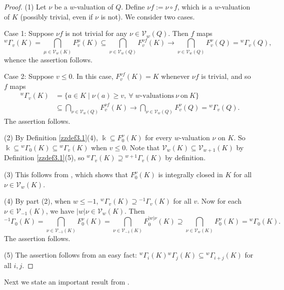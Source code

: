 \documentclass[12pt]{amsart}
\theoremstyle{plain}
\numberwithin{theorem}{section}
\numberwithin{equation}{theorem}
\theoremstyle{definition}
\newcommand \calV {{\mathcal{V}}}
\begin{document}
\begin{proof}
(1) 
Let $\nu$ be a $w$-valuation of $Q$. Define 
$\nu f := \nu \circ f$, which is a
$w$-valuation of $K$ (possibly trivial, even if $\nu$ is not). 
We consider two cases.

Case 1: Suppose $\nu f$ is not trivial for any
$\nu\in {\mathcal V}_w(Q)$.
Then $f$ maps 
$${^{w}\Gamma_{v}}(K)=\bigcap_{\mu\in {\mathcal V}_{w}(K)}
F^{\mu}_v(K) \subseteq \bigcap_{\nu\in {\mathcal V}_{w}(Q)}
F^{\nu f}_v(K) \longrightarrow \bigcap_{\nu\in {\mathcal V}_{w}(Q)}
F^{\nu }_v(Q)={^{w}\Gamma_{v}}(Q),$$ 
whence the assertion follows.

Case 2: Suppose $v \le 0$. In this 
case, $F^{\nu f}_{v}(K)= K$ whenever 
$\nu f$ is trivial, and so $f$ maps 
$$
\begin{aligned}
{^{w}\Gamma_{v}}(K)
&= \{a\in K\mid \nu(a)\geq v, \
\forall \; w\text{-valuations}\ 
\nu\ \text{on}\ K \}  \\
&\subseteq \bigcap_{\nu\in 
{\mathcal V}_{w}(Q)}
F^{\nu f}_v(K) \longrightarrow 
\bigcap_{\nu\in {\mathcal V}_{w}(Q)} 
F^{\nu }_v(Q) ={^{w}\Gamma_{v}}(Q).
\end{aligned}
$$ 
The assertion follows.


(2) By Definition \ref{zzdef3.1}(4), $\Bbbk\subseteq F^{\nu}_0(K)$
for every $w$-valuation $\nu$ on $K$. 
So 
$\Bbbk\subseteq {^{w}\Gamma_{0}}(K)
\subseteq {^{w}\Gamma_{v}}(K)$ when 
$v\leq 0$. Note that ${\mathcal V}_w(K)
\subseteq {\mathcal V}_{w+1}(K)$ by 
Definition \ref{zzdef3.1}(5),
so ${^{w}\Gamma_{v}}(K)\supseteq 
{^{w+1}\Gamma_{v}}(K)$ by definition.

(3) This follows from 
\cite[Lemma 2.4(3)]{HTWZ1}, which 
shows that $F^\nu_0(K)$ is integrally 
closed in $K$ for all 
$\nu \in \calV_w(K)$.

(4) By part (2), when $w\leq -1$, 
${^{w}\Gamma_{v}}(K)\supseteq 
{^{-1}\Gamma_{v}}(K)$ for all $v$. 
Now for each $\nu\in {\mathcal V}_{-1}(K)$, 
we have $|w| \nu\in {\mathcal V}_{w}(K)$. 
Then 
$${^{-1}\Gamma_{0}}(K)
=\bigcap_{\nu\in {\mathcal V}_{-1}(K)}
F^{\nu}_0(K)
=\bigcap_{\nu\in {\mathcal V}_{-1}(K)}
F^{|w|\nu}_0(K) \supseteq 
\bigcap_{\nu\in {\mathcal V}_{w}(K)}
F^{\nu}_0(K)={^{w}\Gamma_{0}}(K).$$
The assertion follows.

(5) The assertion follows from an easy fact: 
${^{w}\Gamma_{i}}(K){^{w}\Gamma_{j}}(K)
\subseteq {^{w}\Gamma_{i+j}}(K)$ 
for all $i,j$. 
\end{proof}

Next we state an important result from \cite{HTWZ1}.
\end{document}
